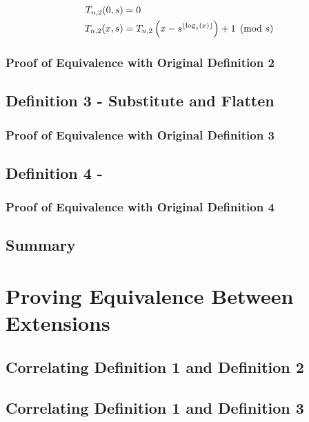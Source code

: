 \documentclass[conference]{IEEEtran}
\begin{document}
\begin{equation}
    \begin{aligned}
        T_{n,2}(0, s) &= 0 \\
        T_{n,2}(x, s) &= T_{n,2}\left(x - s^{\left\lfloor \log_s(x) \right\rfloor}\right) + 1 \pmod{s}
    \end{aligned}
\end{equation}

\subsubsection{Proof of Equivalence with Original Definition 2}

\subsection{Definition 3 - Substitute and Flatten}

\subsubsection{Proof of Equivalence with Original Definition 3}

\subsection{Definition 4 - }

\subsubsection{Proof of Equivalence with Original Definition 4}

\subsection{Summary}

\section{Proving Equivalence Between Extensions}

\subsection{Correlating Definition 1 and Definition 2}

\subsection{Correlating Definition 1 and Definition 3}
\end{document}
